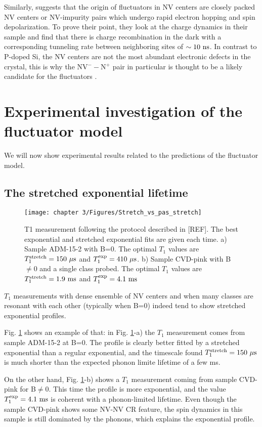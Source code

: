 \documentclass[a4paper,11pt]{report}
\begin{document}
\begin{refsection}
Similarly, \citep{choi2017depolarization} suggests that the origin of fluctuators in NV centers are closely packed NV centers or NV-impurity pairs which undergo rapid electron hopping and spin depolarization. To prove their point, they look at the charge dynamics in their sample and find that there is charge recombination in the dark with a corresponding tunneling rate between neighboring sites of $\sim 10\ \rm ns$. In contrast to P-doped Si, the NV centers are not the most abundant electronic defects in the crystal, this is why the NV$^--$N$^+$ pair in particular is thought to be a likely candidate for the fluctuators \citep{manson2018nv}.

\section{Experimental investigation of the fluctuator model}
We will now show experimental results related to the predictions of the fluctuator model.
\subsection{The stretched exponential lifetime}
\begin{figure}[h]
\centering
\texttt{[image: chapter 3/Figures/Stretch\_vs\_pas\_stretch]}
\caption{T1 measurement following the protocol described in [REF]. The best exponential and stretched exponential fits are given each time. a) Sample ADM-15-2 with B=0. The optimal $T_1$ values are $T_1^{\rm stretch}=150\ \mu \rm s$ and $T_1^{\rm exp}=410\ \mu \rm s$. b) Sample CVD-pink with B$\neq$0 and a single class probed. The optimal $T_1$ values are $T_1^{\rm stretch}=1.9\ \rm ms$ and $T_1^{\rm exp}=4.1\ \rm ms$}
\label{stretch_or_not_stretch}
\end{figure}
$T_1$ measurements with dense ensemble of NV centers and when many classes are resonant with each other (typically when B=0) indeed tend to show stretched exponential profiles.

Fig. \ref{stretch_or_not_stretch} shows an example of that: in Fig. \ref{stretch_or_not_stretch}-a) the $T_1$ measurement comes from sample ADM-15-2 at B=0. The profile is clearly better fitted by a stretched exponential than a regular exponential, and the timescale found $T_1^{\rm stretch}=150\ \mu \rm s$ is much shorter than the expected phonon limite lifetime of a few ms.

On the other hand, Fig. \ref{stretch_or_not_stretch}-b) shows a $T_1$ measurement coming from sample CVD-pink for B$\neq$0. This time the profile is more exponential, and the value $T_1^{\rm exp}=4.1\ \rm ms$ is coherent with a phonon-limited lifetime. Even though the sample CVD-pink shows some NV-NV CR feature, the spin dynamics in this sample is still dominated by the phonons, which explains the exponential profile.



\end{refsection}
\end{document}
